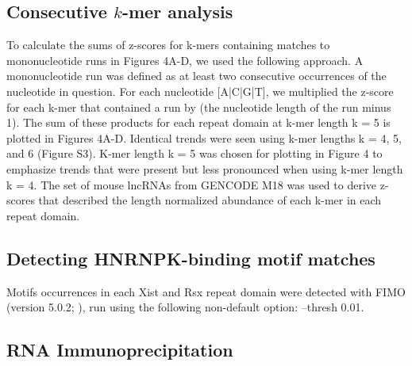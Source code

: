 \subsection{Consecutive $k$-mer analysis}

To calculate the sums of z-scores for k-mers containing matches to mononucleotide runs in Figures 4A-D, we used the following approach. A mononucleotide run was defined as at least two consecutive occurrences of the nucleotide in question. For each nucleotide [A|C|G|T], we multiplied the z-score for each k-mer that contained a run by (the nucleotide length of the run minus 1). The sum of these products for each repeat domain at k-mer length k = 5 is plotted in Figures 4A-D. Identical trends were seen using k-mer lengths k = 4, 5, and 6 (Figure S3). K-mer length k = 5 was chosen for plotting in Figure 4 to emphasize trends that were present but less pronounced when using k-mer length k = 4. The set of mouse lncRNAs from GENCODE M18 was used to derive z-scores that described the length normalized abundance of each k-mer in each repeat domain.

\subsection{Detecting HNRNPK-binding motif matches}
Motifs occurrences in each Xist and Rsx repeat domain were detected with FIMO (version 5.0.2; \cite{Bailey2009MEMESearching}), run using the following non-default option: --thresh 0.01.

\subsection{RNA Immunoprecipitation}


